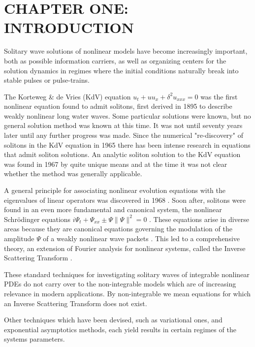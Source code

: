 \chapter{CHAPTER ONE: INTRODUCTION} \label{chapter_1}

Solitary wave solutions of nonlinear models have become increasingly
important, both as possible information carriers,
as well as organizing centers for the solution dynamics in regimes
where the initial conditions naturally break into stable pulses or
pulse-trains.

The Korteweg \& de Vries (KdV) equation $ u_t + u u_x + \delta^2 u_{xxx} = 0$
\cite{KdV}
was the first nonlinear equation found to admit solitons, first derived in 1895
to describe weakly nonlinear long water waves. Some particular solutions were
known, but no general solution method was known at this time.  It was not until
seventy years later until any further progress was made.  Since the numerical
"re-discovery" of solitons in the KdV equation \cite{ZK} in 1965 there has been
intense research in equations that admit soliton solutions.  An analytic soliton
solution to the KdV equation was found in 1967 \cite{GGKM} by quite unique means
and at the time it was not clear whether the method was generally applicable.

A general principle for associating nonlinear evolution equations with the
eigenvalues of linear operators was discovered in 1968 \cite{Lax}.  Soon after,
solitons were found in an even more fundamental and canonical system, the
nonlinear Schr\"odinger equations $ i \Psi_t + \Psi_{xx} \pm \Psi\|\Psi\|^2 = 0
$ \cite{ZS}. These equations arise in diverse areas because they are canonical
equations governing the modulation of the amplitude $\Psi$ of a weakly nonlinear
wave packets \cite{DJ}.  This led to a comprehensive theory, an extension of
Fourier analysis for nonlinear systems, called the Inverse Scattering Transform
\cite{AKNS}.

These standard techniques for investigating solitary waves of integrable
nonlinear PDEs do not carry over to the non-integrable models which are of
increasing relevance in modern applications. By non-integrable we mean equations
for which an Inverse Scattering Transform does not exist.

Other techniques which have been devised, such as variational ones, and
exponential asymptotics methods, each yield results in certain regimes of the
systems parameters.

